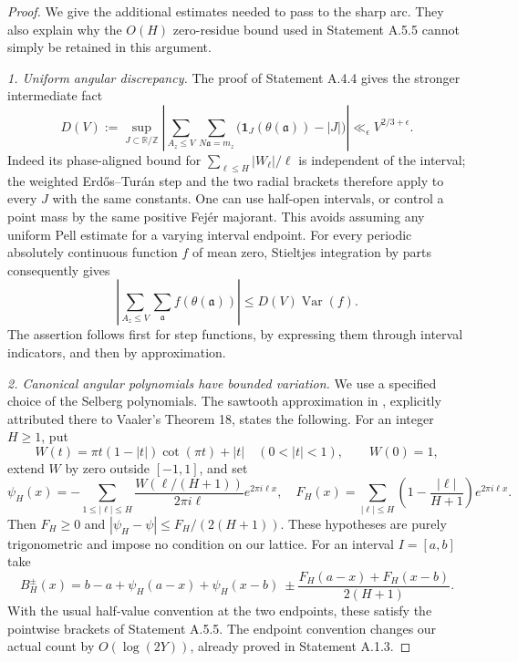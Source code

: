 \begin{proof}
We give the additional estimates needed to pass to the sharp arc.
They also explain why the $O(H)$ zero-residue bound used in
Statement A.5.5 cannot simply be retained in this argument.

\emph{1. Uniform angular discrepancy.}
The proof of Statement A.4.4 gives the stronger intermediate fact
\begin{equation}\label{A:all-interval-discrepancy}
 D(V):=\sup_{J\subset\mathbb R/\mathbb Z}
 \left|\sum_{A_z\leq V}\sum_{N\mathfrak a=m_z}
       \bigl(\mathbf1_J(\theta(\mathfrak a))-|J|\bigr)\right|
 \ll_\epsilon V^{2/3+\epsilon}.
\end{equation}
Indeed its phase-aligned bound for
$\sum_{\ell\leq H}|W_\ell|/\ell$ is independent of the interval;
the weighted Erd\H{o}s--Tur\'an step and the two radial
brackets therefore apply to every $J$ with the same constants.
One can use half-open intervals, or control a point mass by
the same positive Fej\'er majorant. This avoids assuming any
uniform Pell estimate for a varying interval endpoint.
For every periodic absolutely continuous function $f$ of mean zero,
Stieltjes integration by parts consequently gives
\begin{equation}\label{A:BV-discrepancy}
 \left|\sum_{A_z\leq V}\sum_{\mathfrak a}f(\theta(\mathfrak a))\right|
 \leq D(V)\operatorname{Var}(f).
\end{equation}
The assertion follows first for step functions, by expressing
them through interval indicators, and then by approximation.

\emph{2. Canonical angular polynomials have bounded variation.}
We use a specified choice of the Selberg polynomials.
The sawtooth approximation in
\cite[Lemma 2.2]{WangZhang2023}, explicitly attributed there to
Vaaler's Theorem 18, states the following. For an integer $H\geq1$,
put
\[
 W(t)=\pi t(1-|t|)\cot(\pi t)+|t|\quad(0<|t|<1),
 \qquad W(0)=1,
\]
extend $W$ by zero outside $[-1,1]$, and set
\[
 \psi_H(x)=-\sum_{1\leq|\ell|\leq H}
       \frac{W(\ell/(H+1))}{2\pi i\ell}e^{2\pi i\ell x},
 \quad
 F_H(x)=\sum_{|\ell|\leq H}
       \left(1-\frac{|\ell|}{H+1}\right)e^{2\pi i\ell x}.
\]
Then $F_H\geq0$ and
$|\psi_H-\psi|\leq F_H/(2(H+1))$.
These hypotheses are purely trigonometric and impose no
condition on our lattice. For an interval $I=[a,b]$ take
\[
 B_H^\pm(x)=b-a+\psi_H(a-x)+\psi_H(x-b)
 \ \pm\frac{F_H(a-x)+F_H(x-b)}{2(H+1)}.
\]
With the usual half-value convention at the two endpoints,
these satisfy the pointwise brackets of Statement A.5.5.
The endpoint convention changes our actual count by
$O(\log(2Y))$, already proved in Statement A.1.3.


\end{proof}

